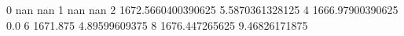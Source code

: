 0 nan nan
1 nan nan
2 1672.5660400390625 5.5870361328125
4 1666.97900390625 0.0
6 1671.875 4.89599609375
8 1676.447265625 9.46826171875
